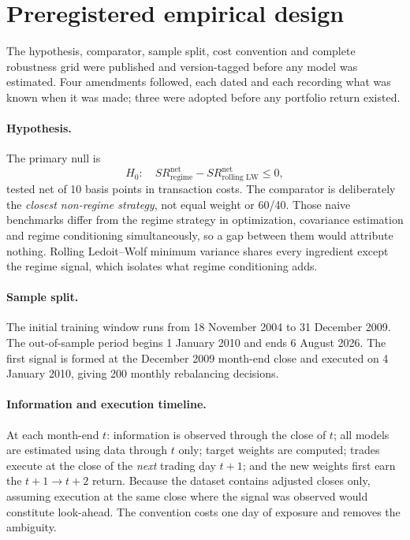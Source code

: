 \documentclass[11pt,letterpaper]{article}
\begin{document}
\section{Preregistered empirical design}
\label{sec:design}

The hypothesis, comparator, sample split, cost convention and complete
robustness grid were published and version-tagged before any model was
estimated. Four amendments followed, each dated and each recording what
was known when it was made; three were adopted before any portfolio
return existed.

\paragraph{Hypothesis.} The primary null is
\begin{equation}
H_0:\quad SR^{\text{net}}_{\text{regime}} -
SR^{\text{net}}_{\text{rolling LW}} \le 0,
\end{equation}
tested net of 10 basis points in transaction costs. The comparator is
deliberately the \emph{closest non-regime strategy}, not equal weight or
60/40. Those naive benchmarks differ from the regime strategy in
optimization, covariance estimation and regime conditioning
simultaneously, so a gap between them would attribute nothing. Rolling
Ledoit--Wolf minimum variance shares every ingredient except the regime
signal, which isolates what regime conditioning adds.

\paragraph{Sample split.} The initial training window runs from
18 November 2004 to 31 December 2009. The out-of-sample period begins
1 January 2010 and ends 6 August 2026. The first signal is formed at the
December 2009 month-end close and executed on 4 January 2010, giving 200
monthly rebalancing decisions.

\paragraph{Information and execution timeline.} At each month-end $t$:
information is observed through the close of $t$; all models are
estimated using data through $t$ only; target weights are computed;
trades execute at the close of the \emph{next} trading day $t+1$; and
the new weights first earn the $t{+}1 \to t{+}2$ return. Because the
dataset contains adjusted closes only, assuming execution at the same
close where the signal was observed would constitute look-ahead. The
convention costs one day of exposure and removes the ambiguity.
\end{document}
